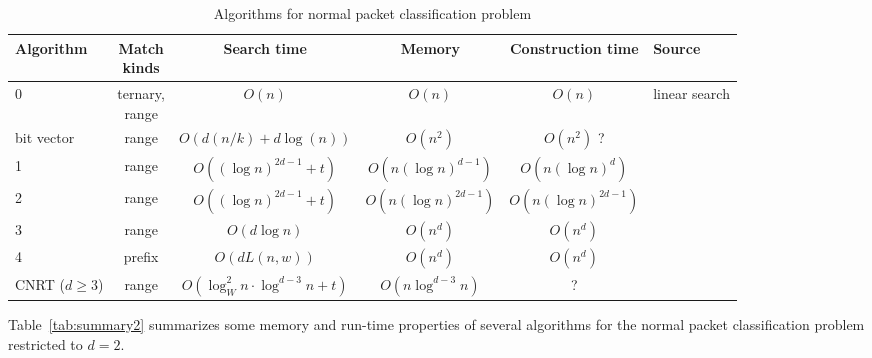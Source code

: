 \documentclass[acmsmall]{acmart}
\begin{document}
\begin{table*}
  \caption{Algorithms for normal packet classification problem}
  \label{tab:summary1}
  \begin{tabular}{lccccl}
    \toprule

      Algorithm
    & \makecell{Match \\ kinds}
    & Search time
    & Memory
    & Construction time
    & Source \\

    \midrule

      0
    & \makecell{ternary, \\ range}
    & $O(n)$
    & $O(n)$
    & $O(n)$
    & linear search
    \\

      bit vector
    & range
    & $O(d(n/k) + d \log(n))$
    & $O(n^2)$
    & $O(n^2)$ ?
    & \cite[Sec. 4]{LS1998}
    \\

      1
    & range
    & $O((\log n)^{2d-1} + t)$
    & $O(n (\log n)^{d-1} )$
    & $O(n (\log n)^d )$
    & \cite[Thm. 3.2]{Edel1983a}
    \\

      2
    & range
    & $O((\log n)^{2d-1} + t)$
    & $O(n (\log n)^{2d-1} )$
    & $O(n (\log n)^{2d-1} )$
    & \cite[Cor. 2.2]{Edel1983a}
    \\

      3
    & range
    & $O(d \log n)$
    & $O(n^d)$
    & $O(n^d)$
    & \cite[Sec. 2.3]{PS1985}
    \\

      4
    & prefix
    & $O(d L(n,w))$
    & $O(n^d)$
    & $O(n^d)$
    & \cite[Sec. 2.3]{PS1985}
    \\

      \makecell{CNRT\footnotemark{} \\ ($d \geq 3$)}
    & range
    & $O(\log^{2}_{W} n \cdot \log^{d-3} n + t)$
    & $O(n \log^{d-3} n)$
    & ?
    & \cite[Thm. 6]{CNRT2022}
    \\

  \bottomrule
\end{tabular}
\end{table*}


Table~\ref{tab:summary2} summarizes some memory and run-time properties of several algorithms for the normal packet classification problem restricted to $d=2$.
\end{document}
